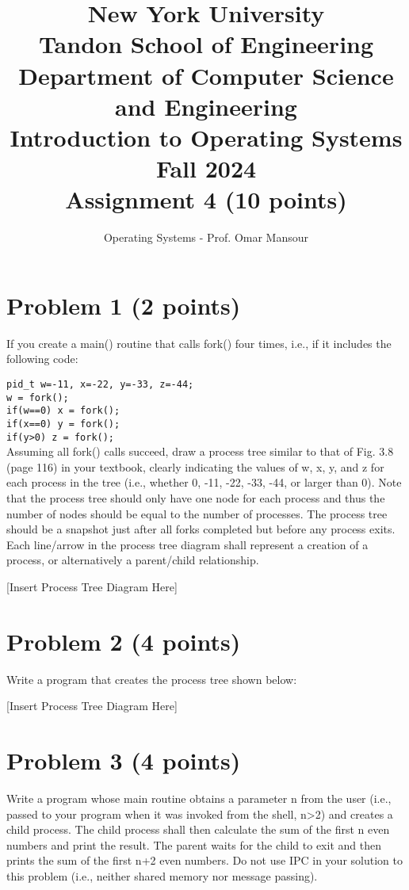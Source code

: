 \documentclass{article}
\title{New York University \\ Tandon School of Engineering \\ Department of Computer Science and Engineering \\ Introduction to Operating Systems \\ Fall 2024 \\ Assignment 4 (10 points)}
\author{Operating Systems - Prof. Omar Mansour}
\date{}
\begin{document}
\maketitle

\section*{Problem 1 (2 points)}

If you create a main() routine that calls fork() four times, i.e., if it includes the following code:

\texttt{pid\_t w=-11, x=-22, y=-33, z=-44;} \\
\texttt{w = fork();}\\
\texttt{if(w==0) x = fork();}\\
\texttt{if(x==0) y = fork();}\\
\texttt{if(y>0) z = fork();}\\

Assuming all fork() calls succeed, draw a process tree similar to that of Fig. 3.8 (page 116) in your textbook, clearly indicating the values of w, x, y, and z for each process in the tree (i.e., whether 0, -11, -22, -33, -44, or larger than 0). Note that the process tree should only have one node for each process and thus the number of nodes should be equal to the number of processes. The process tree should be a snapshot just after all forks completed but before any process exits. Each line/arrow in the process tree diagram shall represent a creation of a process, or alternatively a parent/child relationship.

[Insert Process Tree Diagram Here]


\section*{Problem 2 (4 points)}

Write a program that creates the process tree shown below:

[Insert Process Tree Diagram Here]


\section*{Problem 3 (4 points)}

Write a program whose main routine obtains a parameter n from the user (i.e., passed to your program when it was invoked from the shell, n>2) and creates a child process. The child process shall then calculate the sum of the first n even numbers and print the result. The parent waits for the child to exit and then prints the sum of the first n+2 even numbers.  Do not use IPC in your solution to this problem (i.e., neither shared memory nor message passing).
\end{document}
